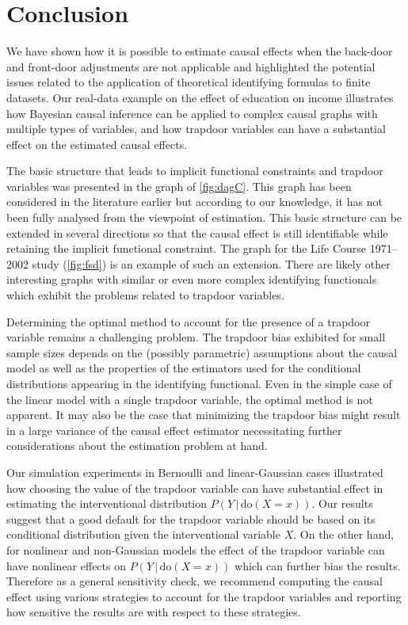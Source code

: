 \documentclass{statsoc}
\newcommand{\+}[1]{\ensuremath{\mathbf{#1}}}
\newcommand{\doo}{\textrm{do}}
\newcommand{\given}{{ \, | \, }}
\newcommand{\z}{trapdoor variable}
\begin{document}
\clearpage

\section{Conclusion}
\label{sec:discussion}

We have shown how it is possible to estimate causal effects when the back-door and front-door adjustments are not applicable and highlighted the potential issues related to the application of theoretical identifying formulas to finite datasets. Our real-data example on the effect of education on income illustrates how Bayesian causal inference can be applied to complex causal graphs with multiple types of variables, and how trapdoor variables can have a substantial effect on the estimated causal effects. 

The basic structure that leads to implicit functional constraints and trapdoor variables was presented in the graph of \autoref{fig:dagC}. This graph has been considered in the literature earlier but according to our knowledge, it has not been fully analysed from the viewpoint of estimation. This basic structure can be extended in several directions so that the causal effect is still identifiable while retaining the implicit functional constraint. The graph for the Life Course 1971--2002 study (\autoref{fig:fsd}) is an example of such an extension. There are likely other interesting graphs with similar or even more complex identifying functionals which exhibit the problems related to trapdoor variables.

Determining the optimal method to account for the presence of a trapdoor variable remains a challenging problem. The trapdoor bias exhibited for small sample sizes depends on the (possibly parametric) assumptions about the causal model as well as the properties of the estimators used for the conditional distributions appearing in the identifying functional. Even in the simple case of the linear model with a single trapdoor variable, the optimal method is not apparent. It may also be the case that minimizing the trapdoor bias might result in a large variance of the causal effect estimator necessitating further considerations about the estimation problem at hand.

Our simulation experiments in  Bernoulli and linear-Gaussian cases illustrated how choosing the value of the \z{} can have substantial effect in estimating the interventional distribution $P(Y \given  \doo(X = x))$. Our results suggest that a good default for the \z{} should be based on its conditional distribution given the interventional variable $X$. On the other hand, for nonlinear and non-Gaussian models the effect of the \z{} can have nonlinear effects on $P(Y \given \doo(X = x))$ which can further bias the results. Therefore as a general sensitivity check, we recommend computing the causal effect using various strategies to account for the \z{}s and reporting how sensitive the results are with respect to these strategies.
\end{document}
